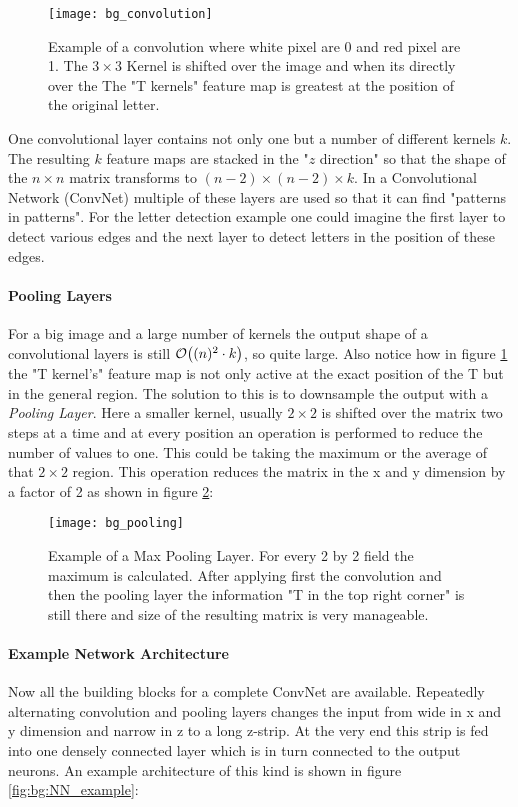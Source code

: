 \begin{figure}[H]
    \centering
    \texttt{[image: bg\_convolution]}
    \caption{Example of a convolution where white pixel are 0 and red pixel are 1. The $3 \times 3$ Kernel is shifted over the image and when its directly over the  The "T kernels" feature map is greatest at the position of the original letter. }
    \label{fig:bg:convolution}
\end{figure}

One convolutional layer contains not only one but a number of different kernels $k$. The resulting $k$ feature maps are stacked in the "$z$ direction" so that the shape of the $n \times n$ matrix transforms to $(n-2) \times (n-2) \times k$. In a Convolutional Network (ConvNet) multiple of these layers are used so that it can find "patterns in patterns". For the letter detection example one could imagine the first layer to detect various edges and the next layer to detect letters in the position of these edges.

\paragraph{Pooling Layers}
For a big image and a large number of kernels the output shape of a convolutional layers is still $\order{(n)^2 \cdot k}$, so quite large. Also notice how in figure \ref{fig:bg:convolution} the "T kernel's" feature map is not only active at the exact position of the T but in the general region. The solution to this is to downsample the output with a \textit{Pooling Layer}. Here a smaller kernel, usually $2 \times 2$ is shifted over the matrix two steps at a time and at every position an operation is performed to reduce the number of values to one. This could be taking the maximum or the average of that $2 \times 2$ region. This operation reduces the matrix in the x and y dimension by a factor of 2 as shown in figure \ref{fig:bg:pooling}:

\begin{figure}[H]
    \centering
    \texttt{[image: bg\_pooling]}
    \caption{Example of a Max Pooling Layer. For every 2 by 2 field the maximum is calculated. After applying first the convolution and then the pooling layer the information "T in the top right corner" is still there and size of the resulting matrix is very manageable.}
    \label{fig:bg:pooling}
\end{figure}

\paragraph{Example Network Architecture}
Now all the building blocks for a complete ConvNet are available. Repeatedly alternating convolution and pooling layers changes the input from wide in x and y dimension and narrow in z to a long z-strip. At the very end this strip is fed into one densely connected layer which is in turn connected to the output neurons. An example architecture of this kind is shown in figure \ref{fig:bg:NN_example}:

